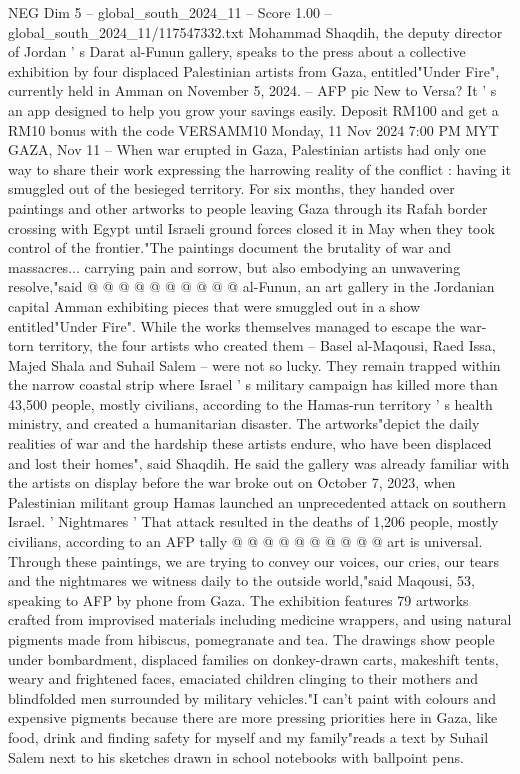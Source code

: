 \begin{textsample}{NEG Dim 5 – global\_south\_2024\_11 – Score 1.00 – global\_south\_2024\_11/117547332.txt}  \label{ex:f5_neg_423}
Mohammad Shaqdih, the deputy director of Jordan ' s Darat al-Funun gallery, speaks to the press about a collective exhibition by four displaced Palestinian artists from Gaza, entitled"Under Fire", currently held in Amman on November 5, 2024. -- AFP pic New to Versa?
It ' s an app designed to help you grow your savings easily.
Deposit RM100 and get a RM10 bonus with the code VERSAMM10 Monday, 11 Nov 2024 7:00 PM MYT GAZA, Nov 11 -- When war erupted in Gaza, Palestinian artists had only one way to share their work expressing the harrowing reality of the conflict : having it smuggled out of the besieged territory.
For six months, they handed over paintings and other artworks to people leaving Gaza through its Rafah border crossing with Egypt until Israeli ground forces closed it in May when they took control of the frontier."The paintings document the brutality of war and massacres... carrying pain and sorrow, but also embodying an unwavering resolve,"said @ @ @ @ @ @ @ @ @ @ al-Funun, an art gallery in the Jordanian capital Amman exhibiting pieces that were smuggled out in a show entitled"Under Fire".
While the works themselves managed to escape the war-torn territory, the four artists who created them -- Basel al-Maqousi, Raed Issa, Majed Shala and Suhail Salem -- were not so lucky.
They remain trapped within the narrow coastal strip where Israel ' s military campaign has killed more than 43,500 people, mostly civilians, according to the Hamas-run territory ' s health ministry, and created a humanitarian disaster.
The artworks"depict the daily realities of war and the hardship these artists endure, who have been displaced and lost their homes", said Shaqdih.
He said the gallery was already familiar with the artists on display before the war broke out on October 7, 2023, when Palestinian militant group Hamas launched an unprecedented attack on southern Israel. ' Nightmares ' That attack resulted in the deaths of 1,206 people, mostly civilians, according to an AFP tally @ @ @ @ @ @ @ @ @ @ art is universal.
Through these paintings, we are trying to convey our voices, our cries, our tears and the nightmares we witness daily to the outside world,"said Maqousi, 53, speaking to AFP by phone from Gaza.
The exhibition features 79 artworks crafted from improvised materials including medicine wrappers, and using natural pigments made from hibiscus, pomegranate and tea.
The drawings show people under bombardment, displaced families on donkey-drawn carts, makeshift tents, weary and frightened faces, emaciated children clinging to their mothers and blindfolded men surrounded by military vehicles."I can't paint with colours and expensive pigments because there are more pressing priorities here in Gaza, like food, drink and finding safety for myself and my family"reads a text by Suhail Salem next to his sketches drawn in school notebooks with ballpoint pens.

\end{textsample}

